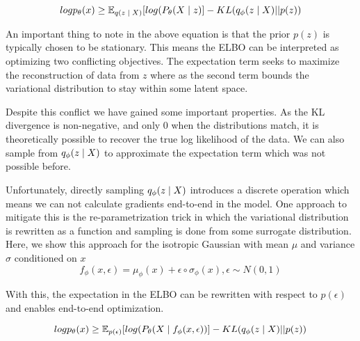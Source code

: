 \begin{equation}
	log p_{\theta}(x) \geq \operatorname{\mathbb{E}}_{q(z \; | \;{X})} [ log(P_{\theta}(X \; | \;{z}) ]  - KL(q_{\phi}(z \; | \;{X}) || p(z))
\end{equation}

An important thing to note in the above equation is that the prior $p(z)$ is typically chosen to be stationary. This means the \ac{ELBO} can be interpreted as optimizing two conflicting objectives. The expectation term seeks to maximize the reconstruction of data from $z$ where as the second term bounds the variational distribution to stay within some latent space.

Despite this conflict we have gained some important properties. As the KL divergence is non-negative, and only 0 when the distributions match, it is theoretically possible to recover the true log likelihood of the data. We can also sample from $q_{\phi}(z \; | \;{X})$ to approximate the expectation term which was not possible before.

Unfortunately, directly sampling $q_{\phi}(z \; | \;{X})$ introduces a discrete operation which means we can not calculate gradients end-to-end in the model. One approach to mitigate this is the re-parametrization trick \cite{kingma2014autoencodingVB,rezende2014stochasticBackprop} in which the variational distribution  is rewritten as a function and sampling is done from some surrogate distribution. Here, we show this approach for the isotropic Gaussian with mean $\mu$ and variance $\sigma$ conditioned on $x$
\begin{equation}
f_{\phi}(x, \epsilon) = \mu_{\phi}(x) + \epsilon \circ \sigma_{\phi}(x), \epsilon \sim N(0, 1)
\end{equation}

With this, the expectation in the \ac{ELBO} can be rewritten with respect to $p(\epsilon)$ and enables end-to-end optimization. 

\begin{equation}
log p_{\theta}(x) \geq \operatorname{\mathbb{E}}_{p(\epsilon) } [ log(P_{\theta}(X \; | \;{f_{\phi}(x, \epsilon)}) ]  - KL(q_{\phi}(z \; | \;{X}) || p(z))
\end{equation}






